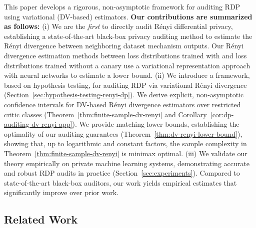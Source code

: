 \documentclass{article}
\theoremstyle{plain}
\theoremstyle{definition}
\theoremstyle{remark}
\begin{document}
This paper develops a rigorous, non-asymptotic framework for auditing
RDP using variational (DV-based) estimators.
\textbf{Our contributions are summarized as follows:}
(i) We are the \textit{first} to directly audit R\'enyi differential privacy, establishing a state-of-the-art black-box privacy auditing method to estimate the R\'enyi divergence between neighboring dataset mechanism outputs.
Our R\'enyi divergence estimation methods between loss distributions trained with and loss distributions trained without a canary use a variational representation approach with neural networks to estimate a lower bound.
(ii) We introduce a framework, based on hypothesis testing, for auditing RDP via variational 
R\'enyi divergence (Section~\ref{sec:hypothesis-testing-renyi-dp}). We derive explicit, non-asymptotic confidence intervals for DV-based R\'enyi divergence estimators over
restricted critic classes (Theorem~\ref{thm:finite-sample-dv-renyi} and
Corollary~\ref{cor:dp-auditing-dv-renyi-app}).
We provide matching lower bounds, establishing the optimality of our auditing guarantees (Theorem~\ref{thm:dv-renyi-lower-bound}), showing that, up to logarithmic and constant factors,
the sample complexity in Theorem~\ref{thm:finite-sample-dv-renyi} is minimax optimal.
(iii) We validate our theory empirically on private machine learning systems, demonstrating accurate and robust
RDP audits in practice (Section~\ref{sec:experiments}). 
Compared to state-of-the-art black-box auditors, our work yields empirical estimates
that significantly improve over prior work.




\subsection{Related Work}
\label{sec:relatedwork}
\end{document}
